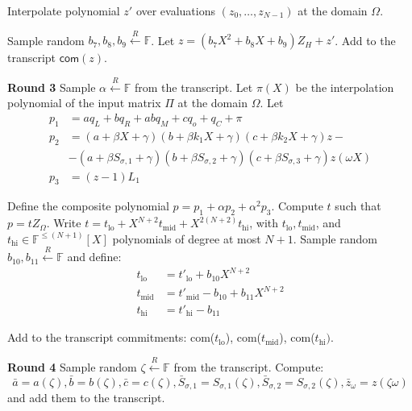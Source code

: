\documentclass[../lecture-notes.tex]{subfiles}
\begin{document}
Interpolate polynomial $z'$ over evaluations $(z_0, \dots, z_{N-1})$ at the domain $\Omega$.

Sample random $b_7, b_8, b_9 \xleftarrow{R} \mathbb{F}$. Let $z = (b_7 X^2 + b_8
X + b_9)Z_H + z'$. Add to the transcript $\mathsf{com}(z)$.

\textcolor{green!60!black}{\textbf{Round 3}} Sample $\alpha \xleftarrow{R}
\mathbb{F}$ from the transcript. Let $\pi(X)$ be the interpolation polynomial of the
input matrix $\Pi$ at the domain $\Omega$. Let
\begin{align*}
p_1 &= aq_L + bq_R + abq_M + cq_o + q_C + \pi \\
p_2 &= (a + \beta X + \gamma)(b + \beta k_1 X + \gamma)(c + \beta k_2 X + \gamma)z - \\
    &- (a + \beta S_{\sigma,1} + \gamma)(b + \beta S_{\sigma,2} + \gamma)(c + \beta S_{\sigma,3} + \gamma)z(\omega X) \\
p_3 &= (z - 1)L_1
\end{align*}

Define the composite polynomial $p = p_1 + \alpha p_2 + \alpha^2 p_3$. Compute
$t$ such that $p = tZ_{\Omega}$. Write $t = t_{\text{lo}} +
X^{N+2}t_{\text{mid}} + X^{2(N+2)}t_{\text{hi}}$, with $t_{\text{lo}},
t_{\text{mid}}$, and $t_{\text{hi}} \in \mathbb{F}^{\leq (N+1)}[X]$ polynomials
of degree at most $N+1$. Sample random $b_{10}, b_{11} \xleftarrow{R} \mathbb{F}$ and define:
\begin{align*}
t_{\text{lo}} &= t'_{\text{lo}} + b_{10}X^{N+2} \\
t_{\text{mid}} &= t'_{\text{mid}} - b_{10} + b_{11}X^{N+2} \\
t_{\text{hi}} &= t'_{\text{hi}} - b_{11}
\end{align*}

Add to the transcript commitments: com($t_{\text{lo}}$), com($t_{\text{mid}}$), com($t_{\text{hi}})$.

\textcolor{green!60!black}{\textbf{Round 4}} Sample random $\zeta \xleftarrow{R}
\mathbb{F}$ from the transcript. Compute:
\[\bar{a} = a(\zeta), \bar{b} = b(\zeta), \bar{c} = c(\zeta), \bar{S}_{\sigma,1} = S_{\sigma,1}(\zeta), \bar{S}_{\sigma,2} = S_{\sigma,2}(\zeta), \bar{z}_{\omega} = z(\zeta \omega)\]
and add them to the transcript.
\end{document}
